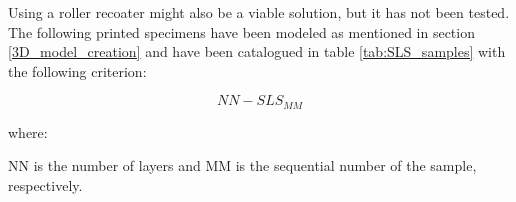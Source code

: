 \documentclass{article}
\begin{document}
          Using a roller recoater might also be a viable solution, but it has not been tested. \\ 
  
          The following printed specimens have been modeled as mentioned in section \ref{3D_model_creation} and 
          have been catalogued in table \ref{tab:SLS_samples} with the following criterion: 
  
          \begin{equation}
              NN-SLS_{MM}
              \label{eq:SLS_specimen_notation}
          \end{equation}
  
          where: 
  
          NN is the number of layers and MM is the sequential number of the sample, respectively. \\ 
  
      \begin{table}[h!]
          \centering
          \caption{A list of the most relevant 3D printed specimens}
      \label{tab:SLS_samples}
      \end{table}
  
\end{document}
